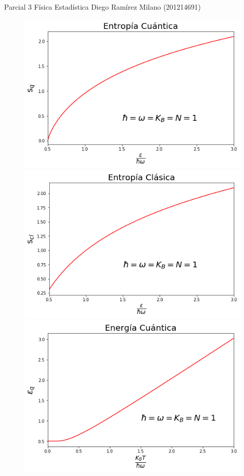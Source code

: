 \documentclass[10pt,a4paper]{article}
\begin{document}
\Large
Parcial 3 Física Estadística
Diego Ramírez Milano (201214691)

\begin{figure}[!h]
\includegraphics[scale=0.5]{sq.png}
\includegraphics[scale=0.5]{scl.png}
\includegraphics[scale=0.5]{eq.png}
\end{figure}
\end{document}

